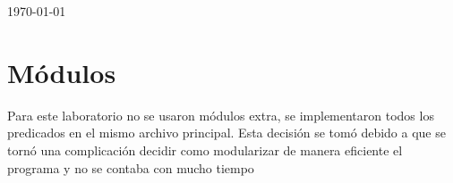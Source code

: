 \documentclass[12pt]{article} %
\begin{document}
\begin{titlepage}
		{\large \today}\\[1cm] %
		
		\vfill %
		
	\end{titlepage}
	
	\section{Módulos}
	
	Para este laboratorio no se usaron módulos extra, se implementaron todos los predicados en el mismo archivo principal. Esta decisión se tomó debido a que se tornó una complicación decidir como modularizar de manera eficiente el programa y no se contaba con mucho tiempo
	
\end{document}
